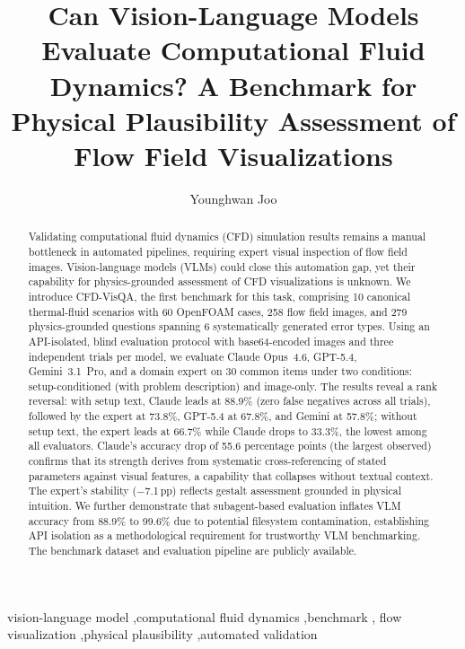 \documentclass[preprint,12pt]{elsarticle}
\begin{document}
\begin{frontmatter}

\title{Can Vision-Language Models Evaluate Computational Fluid Dynamics? A Benchmark for Physical Plausibility Assessment of Flow Field Visualizations}

\author[kier,ust]{Younghwan Joo}

\address[kier]{Energy Efficiency Research Division, Korea Institute of Energy Research, 152 Gajeong-ro, Yuseong-gu, Daejeon 34129, Republic of Korea}
\address[ust]{Energy Engineering, University of Science \& Technology, 217 Gajeong-ro, Yuseong-gu, Daejeon 34129, Republic of Korea}

\begin{abstract}
Validating computational fluid dynamics (CFD) simulation results remains a manual
bottleneck in automated pipelines, requiring expert visual inspection of flow field
images. Vision-language models (VLMs) could close this automation gap, yet their
capability for physics-grounded assessment of CFD visualizations is unknown. We
introduce CFD-VisQA, the first benchmark for this task, comprising 10 canonical
thermal-fluid scenarios with 60 OpenFOAM cases, 258 flow field images, and 279
physics-grounded questions spanning 6 systematically generated error types. Using an
API-isolated, blind evaluation protocol with base64-encoded images and three
independent trials per model, we evaluate Claude Opus~4.6, GPT-5.4, Gemini~3.1~Pro,
and a domain expert on 30 common items under two conditions: setup-conditioned (with
problem description) and image-only. The results reveal a rank reversal:
with setup text, Claude leads at 88.9\% (zero false negatives across all trials),
followed by the expert at 73.8\%, GPT-5.4 at 67.8\%, and Gemini at 57.8\%; without
setup text, the expert leads at 66.7\% while Claude drops to 33.3\%, the lowest
among all evaluators. Claude's accuracy drop of 55.6 percentage points (the largest
observed) confirms that its strength derives from systematic cross-referencing of
stated parameters against visual features, a capability that collapses without
textual context. The expert's stability ($-$7.1\,pp) reflects gestalt assessment
grounded in physical intuition. We further demonstrate that subagent-based evaluation
inflates VLM accuracy from 88.9\% to 99.6\% due to potential filesystem
contamination, establishing API isolation as a methodological requirement for
trustworthy VLM benchmarking. The benchmark dataset and evaluation pipeline are
publicly available.
\end{abstract}

\begin{keyword}
vision-language model \sep computational fluid dynamics \sep benchmark \sep
flow visualization \sep physical plausibility \sep automated validation
\end{keyword}

\end{frontmatter}
\end{document}
